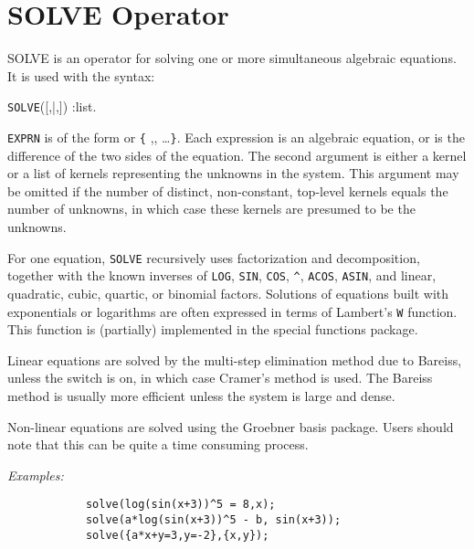\section{SOLVE Operator}
\hypertarget{operator:SOLVE}{}
SOLVE is an operator for solving one or more simultaneous algebraic
equations. It is used with the syntax:
\begin{syntax}
  \texttt{SOLVE}([,|,])
         :list.
\end{syntax}
\texttt{EXPRN} is of the form  or
\texttt{\{} ,, \dots \texttt{\}}.  
Each expression is an
algebraic equation, or is the difference of the two sides of the equation.
The second argument is either a kernel or a list of kernels representing
the unknowns in the system.  This argument may be omitted if the number of
distinct, non-constant, top-level kernels equals the number of unknowns,
in which case these kernels are presumed to be the unknowns.

For one equation, \texttt{SOLVE} recursively uses
factorization and decomposition, together with the known inverses of
\texttt{LOG}, \texttt{SIN}, \texttt{COS}, \texttt{\textasciicircum}, 
\texttt{ACOS}, \texttt{ASIN}, and
linear, quadratic, cubic, quartic, or binomial factors. Solutions
of equations built with exponentials or logarithms are often
expressed in terms of Lambert's \texttt{W} function.
This function is (partially) implemented in the special functions package.

\hypertarget{switch:CRAMER}{}
Linear equations are solved by the multi-step elimination method due to
Bareiss, unless the switch  is on, in which
case Cramer's method is used.  The Bareiss method is usually more
efficient unless the system is large and dense.

Non-linear equations are solved using the Groebner basis 
package. 
Users should note that this 
can be quite a time consuming process.

\textit{Examples:}
\begin{verbatim}
            solve(log(sin(x+3))^5 = 8,x);
            solve(a*log(sin(x+3))^5 - b, sin(x+3));
            solve({a*x+y=3,y=-2},{x,y});
\end{verbatim}

